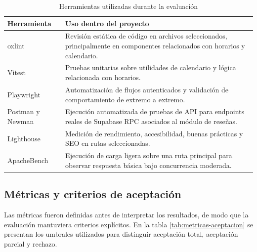 \documentclass[11pt,spanish]{article}
\begin{document}
\begin{table}[H]
\centering
\caption{Herramientas utilizadas durante la evaluación}
\label{tab:herramientas}
\begin{tabularx}{\textwidth}{p{3.5cm} Y}
\toprule
\textbf{Herramienta} & \textbf{Uso dentro del proyecto} \\
\midrule
oxlint & Revisión estática de código en archivos seleccionados, principalmente en componentes relacionados con horarios y calendario. \\
Vitest & Pruebas unitarias sobre utilidades de calendario y lógica relacionada con horarios. \\
Playwright & Automatización de flujos autenticados y validación de comportamiento de extremo a extremo. \\
Postman y Newman & Ejecución automatizada de pruebas de API para endpoints reales de Supabase RPC asociados al módulo de reseñas. \\
Lighthouse & Medición de rendimiento, accesibilidad, buenas prácticas y SEO en rutas seleccionadas. \\
ApacheBench & Ejecución de carga ligera sobre una ruta principal para observar respuesta básica bajo concurrencia moderada. \\
\bottomrule
\end{tabularx}
\end{table}

\subsection{Métricas y criterios de aceptación}

Las métricas fueron definidas antes de interpretar los resultados, de modo que la evaluación mantuviera criterios explícitos. En la tabla \ref{tab:metricas-aceptacion} se presentan los umbrales utilizados para distinguir aceptación total, aceptación parcial y rechazo.
\end{document}
